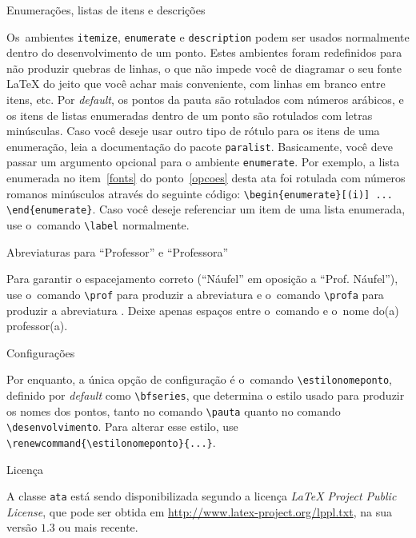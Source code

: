 \documentclass[12pt,a4paper,euler,beton]{ata}
\begin{document}
\begin{ponto}[listas]{Enumerações, listas de itens e descrições} 

  Os~ambientes \texttt{itemize}, \texttt{enumerate} e
  \texttt{description} podem ser usados normalmente dentro do
  desenvolvimento de um ponto. Estes ambientes foram redefinidos para
  não produzir quebras de linhas, o que não impede você de diagramar o
  seu fonte \LaTeX{} do jeito que você achar mais conveniente, com
  linhas em branco entre itens, etc. Por \emph{default}, os pontos da
  pauta são rotulados com números arábicos, e os itens de listas
  enumeradas dentro de um ponto são rotulados com letras minúsculas.
  Caso você deseje usar outro tipo de rótulo para os itens de uma
  enumeração, leia a documentação do pacote \texttt{paralist}.
  Basicamente, você deve passar um argumento opcional para o ambiente
  \verb+enumerate+. Por exemplo, a lista enumerada no item~\ref{fonts}
  do ponto~\ref{opcoes} desta ata foi rotulada com números romanos
  minúsculos através do seguinte código:
  \verb+\begin{enumerate}[(i)] ... \end{enumerate}+. Caso você deseje
  referenciar um item de uma lista enumerada, use o~comando
  \verb+\label+ normalmente.

\end{ponto}


\begin{ponto}{Abreviaturas para ``Professor'' e ``Professora''}

  Para garantir o espacejamento correto (``\prof Náufel'' em oposição
  a ``Prof. Náufel''), use o~comando \verb+\prof+ para produzir a
  abreviatura \prof e o~comando \verb+\profa+ para produzir a
  abreviatura \profa. Deixe apenas espaços entre o~comando e o~nome
  do(a) professor(a).

\end{ponto}


\begin{ponto}{Configurações}

  Por enquanto, a única opção de configuração é o~comando
  \verb+\estilonomeponto+, definido por \emph{default} como
  \verb+\bfseries+, que determina o estilo usado para produzir os
  nomes dos pontos, tanto no comando \verb+\pauta+ quanto no comando
  \verb+\desenvolvimento+. Para alterar esse estilo, use
  \verb+\renewcommand{\estilonomeponto}{...}+.

\end{ponto}


\begin{ponto}{Licença}

  A classe \texttt{ata} está sendo disponibilizada segundo a licença
  \emph{LaTeX Project Public License}, que pode ser obtida em
  \url{http://www.latex-project.org/lppl.txt}, na sua versão $1.3$ ou
  mais recente.

\end{ponto}
\end{document}
